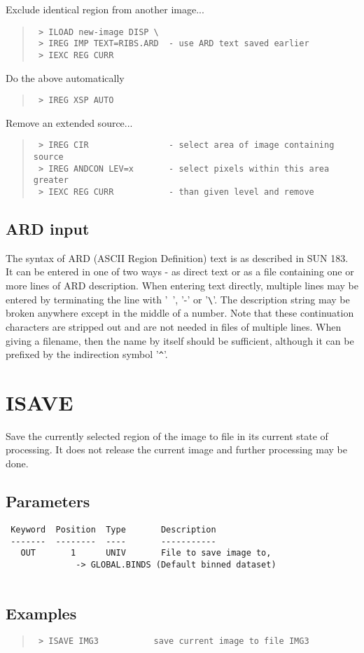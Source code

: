 \documentclass{book}
\renewcommand{\_}{{\tt\char'137}}     %
\begin{document}
Exclude identical region from another image...
\begin{quote}\begin{verbatim}
 > ILOAD new-image DISP \
 > IREG IMP TEXT=RIBS.ARD  - use ARD text saved earlier
 > IEXC REG CURR
\end{verbatim}\end{quote}
Do the above automatically
\begin{quote}\begin{verbatim}
 > IREG XSP AUTO
\end{verbatim}\end{quote}
Remove an extended source...
\begin{quote}\begin{verbatim}
 > IREG CIR                - select area of image containing source
 > IREG ANDCON LEV=x       - select pixels within this area greater
 > IEXC REG CURR           - than given level and remove
\end{verbatim}\end{quote}
\subsection{ARD input}
The syntax of ARD (ASCII Region Definition) text is as described in
SUN 183. It can be entered in one of two ways - as direct text or
as a file containing one or more lines of ARD description. When
entering text directly, multiple lines may be entered by terminating
the line with '~', '-' or '\verb+\+'. The description string may be
broken anywhere except in the middle of a number. Note that these
continuation characters are stripped out and are not needed in files
of multiple lines. When giving a filename, then the name by itself
should be sufficient, although it can be prefixed by the indirection
symbol '\verb+^+'.
 
\section{ISAVE}
Save the currently selected region of the image to file in its
current state of processing. It does not release the current
image and further processing may be done.
 
\subsection{Parameters}
\begin{verbatim}
 Keyword  Position  Type       Description
 -------  --------  ----       -----------
   OUT       1      UNIV       File to save image to,
              -> GLOBAL.BINDS (Default binned dataset)
 
\end{verbatim}\subsection{Examples}
\begin{quote}\begin{verbatim}
 > ISAVE IMG3           save current image to file IMG3
 \end{verbatim}\end{quote}
\end{document}
